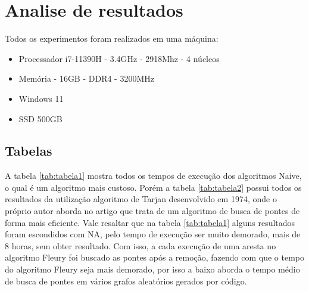 \newpage
\section{\esp Analise de resultados}

Todos os experimentos foram realizados em uma máquina: 
\begin{itemize}
  \item Processador i7-11390H - 3.4GHz - 2918Mhz - 4 núcleos 
  \item Memória - 16GB - DDR4 - 3200MHz
  \item Windows 11
  \item SSD 500GB
\end{itemize}


\subsection{\esp Tabelas}

A tabela \ref{tab:tabela1} mostra todos os tempos de execução dos algoritmos Naive, o qual é um algoritmo mais custoso. Porém a tabela \ref{tab:tabela2} possui todos os resultados da utilização algoritmo de Tarjan desenvolvido em 1974, onde o próprio autor aborda no artigo \cite{tarjan} que trata de um algoritmo de busca de pontes de forma mais eficiente. Vale resaltar que na tabela \ref{tab:tabela1} alguns resultados foram escondidos com NA, pelo tempo de execução ser muito demorado, mais de 8 horas, sem obter resultado. Com isso, a cada execução de uma aresta no algoritmo Fleury foi buscado as pontes após a remoção, fazendo com que o tempo do algoritmo Fleury seja mais demorado, por isso a baixo aborda o tempo médio de busca de pontes em vários grafos aleatórios gerados por código.

